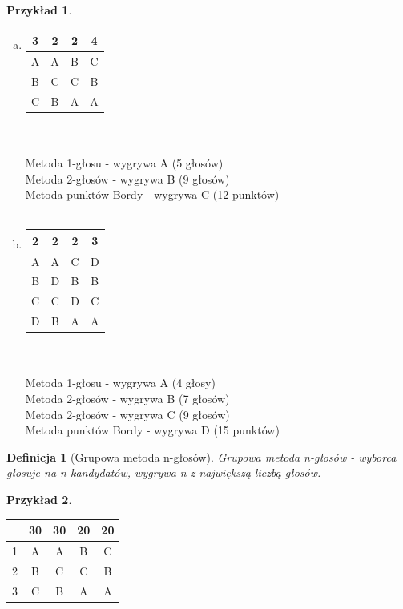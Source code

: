 \documentclass[12pt,a4paper]{article}
\theoremstyle{break}
\newtheorem{definition}{Definicja}[section]
\newtheorem{example}{Przykład}[section]
\begin{document}
	\begin{example} \end{example} \begin{enumerate}[a)]
	
	\item \begin{tabular}{|c|c|c|c|}\hline
		3&2&2&4\\\hline
		A&A&B&C\\\hline
		B&C&C&B\\\hline
		C&B&A&A\\\hline
	\end{tabular}\\\\

	Metoda 1-głosu - wygrywa A (5 głosów)\\
	Metoda 2-głosów - wygrywa B (9 głosów)\\
	Metoda punktów Bordy - wygrywa C (12 punktów)\\\\

	\item \begin{tabular}{|c|c|c|c|}\hline
		2&2&2&3\\\hline
		A&A&C&D\\\hline
		B&D&B&B\\\hline
		C&C&D&C\\\hline
		D&B&A&A\\\hline
	\end{tabular}\\\\

	Metoda 1-głosu - wygrywa A (4 głosy)\\
	Metoda 2-głosów - wygrywa B (7 głosów)\\
	Metoda 2-głosów - wygrywa C (9 głosów)\\
	Metoda punktów Bordy - wygrywa D (15 punktów)
	
	\end{enumerate} 
	
	
	\begin{definition}[Grupowa metoda n-głosów]
		Grupowa metoda n-głosów - wyborca głosuje na n kandydatów, wygrywa n z największą liczbą głosów.
	\end{definition}
	
	\begin{example}
		
	\end{example}
	
	\begin{tabular}{|c|c|c|c|c|}\hline
		&30&30&20&20\\\hline
		1&A&A&B&C\\\hline
		2&B&C&C&B\\\hline
		3&C&B&A&A\\\hline
	\end{tabular}\\\\
\end{document}

